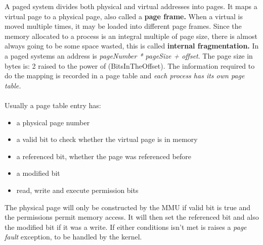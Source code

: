 \documentclass[twoside]{article}
\begin{document}
A paged system divides both physical and virtual addresses into pages. It maps 
a virtual page to a physical page, also called a \textbf{page frame.} When a 
virtual is moved multiple times, it may be loaded into different page frames. 
Since the memory allocated to a process is an integral multiple of page size, 
there is almost always going to be some space wasted, this is called 
\textbf{internal fragmentation.} In a paged systems an address is 
\emph{pageNumber * pageSize + offset}. The page size in bytes is: 2 raised to 
the power of (BitsInTheOffset). The information required to do the mapping is 
recorded in a page table and \emph{each process has its own page table.}\\ \\

Usually a page table entry has:
\begin{itemize}
\item a physical page number
\item a valid bit to check whether the virtual page is in memory
\item a referenced bit, whether the page was referenced before
\item a modified bit
\item read, write and execute permission bits
\end{itemize}
The physical page will only be constructed by the MMU if valid bit is true and the permissions permit memory access. It will then set the referenced bit and also the modified bit if it was a write. If either conditions isn't met is raises a \emph{page fault} exception, to be handled by the kernel.
\end{document}
